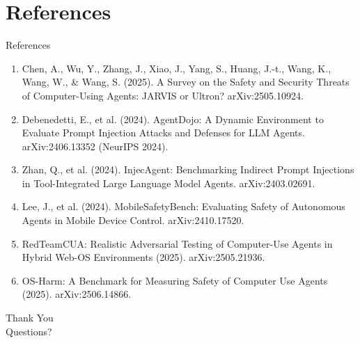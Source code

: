 \documentclass[10pt]{beamer}
\begin{document}
\section{References}
\begin{frame}[allowframebreaks]{References}
  \footnotesize
  \begin{enumerate}
    \item Chen, A., Wu, Y., Zhang, J., Xiao, J., Yang, S., Huang, J.-t., Wang, K., Wang, W., \& Wang, S. (2025). A Survey on the Safety and Security Threats of Computer-Using Agents: JARVIS or Ultron? arXiv:2505.10924.
    \item Debenedetti, E., et al. (2024). AgentDojo: A Dynamic Environment to Evaluate Prompt Injection Attacks and Defenses for LLM Agents. arXiv:2406.13352 (NeurIPS 2024).
    \item Zhan, Q., et al. (2024). InjecAgent: Benchmarking Indirect Prompt Injections in Tool-Integrated Large Language Model Agents. arXiv:2403.02691.
    \item Lee, J., et al. (2024). MobileSafetyBench: Evaluating Safety of Autonomous Agents in Mobile Device Control. arXiv:2410.17520.
    \item RedTeamCUA: Realistic Adversarial Testing of Computer-Use Agents in Hybrid Web-OS Environments (2025). arXiv:2505.21936.
    \item OS-Harm: A Benchmark for Measuring Safety of Computer Use Agents (2025). arXiv:2506.14866.
  \end{enumerate}
\end{frame}
\begin{frame}[plain]
  \begin{center}
    {\Huge Thank You}\\[1em]
    {\large Questions?}
  \end{center}
\end{frame}
\end{document}

